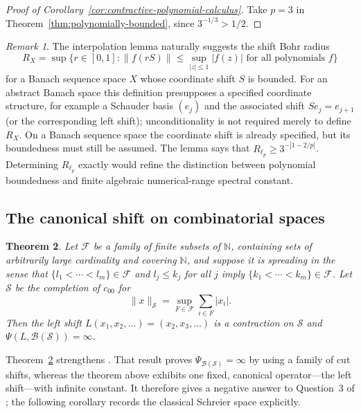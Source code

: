 \documentclass[a4paper]{amsart}
\newtheorem{theorem}{Theorem}[section]
\theoremstyle{remark}
\newtheorem{remark}[theorem]{Remark}
\newcommand{\N}{\mathbb N}
\newcommand{\calB}{\mathcal B}
\newcommand{\calF}{\mathcal F}
\newcommand{\calS}{\mathcal S}
\begin{document}
\begin{proof}[Proof of Corollary~\ref{cor:contractive-polynomial-calculus}]
Take $p=3$ in Theorem~\ref{thm:polynomially-bounded}, since $3^{-1/3}>1/2$.
\end{proof}

\begin{remark}
The interpolation lemma naturally suggests the shift Bohr radius
\[
       R_X=\sup\{r\in[0,1]:\|f(rS)\|\leqslant\sup_{|z|\leqslant1}|f(z)|\text{ for all polynomials }f\}
\]
for a Banach sequence space $X$ whose coordinate shift $S$ is bounded.  For an abstract Banach space this definition presupposes a specified coordinate structure, for example a Schauder basis $(e_j)$ and the associated shift $Se_j=e_{j+1}$ (or the corresponding left shift); unconditionality is not required merely to define $R_X$.  On a Banach sequence space the coordinate shift is already specified, but its boundedness must still be assumed.  The lemma says that $R_{\ell_p}\geqslant3^{-|1-2/p|}$.  Determining $R_{\ell_p}$ exactly would refine the distinction between polynomial boundedness and finite algebraic numerical-range spectral constant.
\end{remark}

\subsection{The canonical shift on combinatorial spaces}\label{sec:shift-obstructions}

\begin{theorem}\label{thm:combinatorial}
Let $\calF$ be a family of finite subsets of $\N$, containing sets of arbitrarily large cardinality and covering $\N$, and suppose it is spreading in the sense that $\{l_1<\cdots<l_m\}\in\calF$ and $l_j\leqslant k_j$ for all $j$ imply $\{k_1<\cdots<k_m\}\in\calF$.  Let $\calS$ be the completion of $c_{00}$ for
\[
       \|x\|_{\calS}=\sup_{F\in\calF}\sum_{i\in F}|x_i|.
\]
Then the left shift $L(x_1,x_2,\ldots)=(x_2,x_3,\ldots)$ is a contraction on $\calS$ and $\Psi(L,\calB(\calS))=\infty$.
\end{theorem}

Theorem~\ref{thm:combinatorial} strengthens \cite[Theorem~6.3]{BHDVW}.  That result proves $\Psi_{\calB(\calS)}=\infty$ by using a family of cut shifts, whereas the theorem above exhibits one fixed, canonical operator---the left shift---with infinite constant.  It therefore gives a negative answer to Question~3 of \cite[Section~8]{BHDVW}; the following corollary records the classical Schreier space explicitly.
\end{document}
